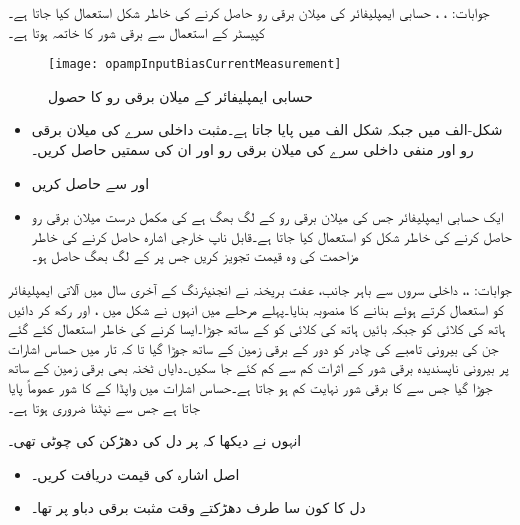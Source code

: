 جوابات: ، ،  
حسابی ایمپلیفائر کی میلان برقی رو حاصل کرنے کی خاطر شکل  استعمال کیا جاتا ہے۔کپیسٹر کے استعمال سے برقی شور کا خاتمہ ہوتا ہے۔
\begin{figure}
\centering
\texttt{[image: opampInputBiasCurrentMeasurement]}
\caption{حسابی ایمپلیفائر کے میلان برقی رو کا حصول}
\label{شکل__سوال_حسابی_میلان_برقی_رو}
\end{figure}
\begin{itemize}
\item
شکل-الف میں  جبکہ شکل  الف     میں   پایا جاتا ہے۔مثبت داخلی سرے  کی میلان برقی رو  اور منفی داخلی سرے  کی میلان برقی رو   اور ان کی سمتیں حاصل کریں۔
\item
{} اور  سے  حاصل کریں
\item
ایک حسابی ایمپلیفائر جس کی میلان برقی رو  کے لگ بھگ ہے کی مکمل درست میلان برقی رو حاصل کرنے کی خاطر شکل کو استعمال کیا جاتا ہے۔قابل ناپ خارجی اشارہ حاصل کرنے کی خاطر مزاحمت کی وہ قیمت تجویز کریں جس پر  کے لگ بھگ حاصل ہو۔
\end{itemize}
جوابات: ،، داخلی سروں سے باہر جانب، 
عفت بریخنہ نے انجنیئرنگ کے آخری سال میں آلاتی ایمپلیفائر کو استعمال کرتے ہوئے  بنانے کا منصوبہ بنایا۔پہلے مرحلے میں انہوں نے شکل  میں ،  اور  رکھ کر دائیں ہاتھ کی کلائی کو  جبکہ بائیں ہاتھ کی کلائی کو  کے ساتھ جوڑا۔ایسا کرنے کی خاطر  استعمال کئے گئے جن کی بیرونی تامبے کی چادر کو دور کے برقی زمین کے ساتھ جوڑا گیا تا کہ تار میں حساس اشارات پر بیرونی ناپسندیدہ برقی شور کے اثرات کم سے کم کئے جا سکیں۔دایاں ٹخنہ بھی برقی زمین کے ساتھ جوڑا گیا جس سے  کا برقی شور نہایت کم ہو جاتا ہے۔حساس اشارات میں واپڈا کے  کا شور عموماً پایا جاتا ہے جس سے نپٹنا ضروری ہوتا ہے۔

انہوں نے دیکھا کہ  پر دل کی دھڑکن کی چوٹی  تھی۔
\begin{itemize}
\item
اصل اشارہ  کی قیمت دریافت کریں۔
\item
دل کا کون سا طرف دھڑکتے وقت مثبت برقی دباو پر تھا۔
\end{itemize}

